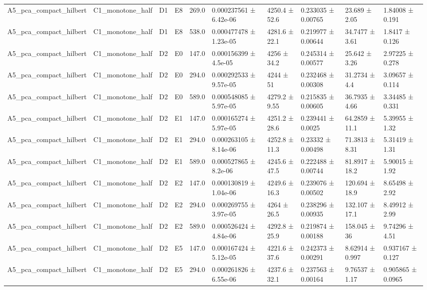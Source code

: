 \begin{table}
\begin{tabular}{llllllllll}
A5\_pca\_compact\_hilbert & C1\_monotone\_half & D1 & E8 & 269.0 & 0.000237561 ± 6.42e-06 & 4250.4 ± 52.6 & 0.233035 ± 0.00765 & 23.689 ± 2.05 & 1.84008 ± 0.191 \\
A5\_pca\_compact\_hilbert & C1\_monotone\_half & D1 & E8 & 538.0 & 0.000477478 ± 1.23e-05 & 4281.6 ± 22.1 & 0.219977 ± 0.00644 & 34.7477 ± 3.61 & 1.8417 ± 0.126 \\
A5\_pca\_compact\_hilbert & C1\_monotone\_half & D2 & E0 & 147.0 & 0.000156399 ± 4.5e-05 & 4256 ± 34.2 & 0.245314 ± 0.00577 & 25.642 ± 3.26 & 2.97225 ± 0.278 \\
A5\_pca\_compact\_hilbert & C1\_monotone\_half & D2 & E0 & 294.0 & 0.000292533 ± 9.57e-05 & 4244 ± 51 & 0.232468 ± 0.00308 & 31.2734 ± 4.4 & 3.09657 ± 0.114 \\
A5\_pca\_compact\_hilbert & C1\_monotone\_half & D2 & E0 & 589.0 & 0.000548085 ± 5.97e-05 & 4279.2 ± 9.55 & 0.215835 ± 0.00605 & 36.7935 ± 4.66 & 3.34485 ± 0.331 \\
A5\_pca\_compact\_hilbert & C1\_monotone\_half & D2 & E1 & 147.0 & 0.000165274 ± 5.97e-05 & 4251.2 ± 28.6 & 0.239441 ± 0.0025 & 64.2859 ± 11.1 & 5.39955 ± 1.32 \\
A5\_pca\_compact\_hilbert & C1\_monotone\_half & D2 & E1 & 294.0 & 0.000263105 ± 8.14e-06 & 4252.8 ± 11.3 & 0.23332 ± 0.00498 & 71.3813 ± 8.31 & 5.31419 ± 1.31 \\
A5\_pca\_compact\_hilbert & C1\_monotone\_half & D2 & E1 & 589.0 & 0.000527865 ± 8.2e-06 & 4245.6 ± 47.5 & 0.222488 ± 0.00744 & 81.8917 ± 18.2 & 5.90015 ± 1.92 \\
A5\_pca\_compact\_hilbert & C1\_monotone\_half & D2 & E2 & 147.0 & 0.000130819 ± 1.04e-06 & 4249.6 ± 16.3 & 0.239076 ± 0.00502 & 120.694 ± 18.9 & 8.65498 ± 2.92 \\
A5\_pca\_compact\_hilbert & C1\_monotone\_half & D2 & E2 & 294.0 & 0.000269755 ± 3.97e-05 & 4264 ± 26.5 & 0.238296 ± 0.00935 & 132.107 ± 17.1 & 8.49912 ± 2.99 \\
A5\_pca\_compact\_hilbert & C1\_monotone\_half & D2 & E2 & 589.0 & 0.000526424 ± 4.84e-06 & 4292.8 ± 25.9 & 0.219874 ± 0.00188 & 158.045 ± 36 & 9.74296 ± 4.51 \\
A5\_pca\_compact\_hilbert & C1\_monotone\_half & D2 & E5 & 147.0 & 0.000167424 ± 5.12e-05 & 4221.6 ± 37.6 & 0.242373 ± 0.00291 & 8.62914 ± 0.997 & 0.937167 ± 0.127 \\
A5\_pca\_compact\_hilbert & C1\_monotone\_half & D2 & E5 & 294.0 & 0.000261826 ± 6.55e-06 & 4237.6 ± 32.1 & 0.237563 ± 0.00164 & 9.76537 ± 1.17 & 0.905865 ± 0.0965 \\

\end{tabular}
\end{table}
